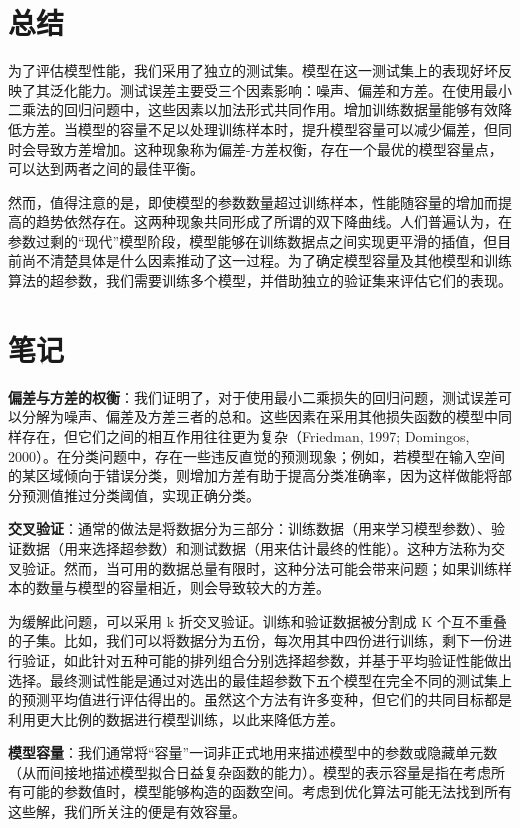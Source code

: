 \section{总结}

为了评估模型性能，我们采用了独立的测试集。模型在这一测试集上的表现好坏反映了其泛化能力。测试误差主要受三个因素影响：噪声、偏差和方差。在使用最小二乘法的回归问题中，这些因素以加法形式共同作用。增加训练数据量能够有效降低方差。当模型的容量不足以处理训练样本时，提升模型容量可以减少偏差，但同时会导致方差增加。这种现象称为偏差-方差权衡，存在一个最优的模型容量点，可以达到两者之间的最佳平衡。

然而，值得注意的是，即使模型的参数数量超过训练样本，性能随容量的增加而提高的趋势依然存在。这两种现象共同形成了所谓的双下降曲线。人们普遍认为，在参数过剩的“现代”模型阶段，模型能够在训练数据点之间实现更平滑的插值，但目前尚不清楚具体是什么因素推动了这一过程。为了确定模型容量及其他模型和训练算法的超参数，我们需要训练多个模型，并借助独立的验证集来评估它们的表现。
\section{笔记}
\textbf{偏差与方差的权衡}：我们证明了，对于使用最小二乘损失的回归问题，测试误差可以分解为噪声、偏差及方差三者的总和。这些因素在采用其他损失函数的模型中同样存在，但它们之间的相互作用往往更为复杂（Friedman, 1997; Domingos, 2000）。在分类问题中，存在一些违反直觉的预测现象；例如，若模型在输入空间的某区域倾向于错误分类，则增加方差有助于提高分类准确率，因为这样做能将部分预测值推过分类阈值，实现正确分类。

\textbf{交叉验证}：通常的做法是将数据分为三部分：训练数据（用来学习模型参数）、验证数据（用来选择超参数）和测试数据（用来估计最终的性能）。这种方法称为交叉验证。然而，当可用的数据总量有限时，这种分法可能会带来问题；如果训练样本的数量与模型的容量相近，则会导致较大的方差。

为缓解此问题，可以采用 k 折交叉验证。训练和验证数据被分割成 K 个互不重叠的子集。比如，我们可以将数据分为五份，每次用其中四份进行训练，剩下一份进行验证，如此针对五种可能的排列组合分别选择超参数，并基于平均验证性能做出选择。最终测试性能是通过对选出的最佳超参数下五个模型在完全不同的测试集上的预测平均值进行评估得出的。虽然这个方法有许多变种，但它们的共同目标都是利用更大比例的数据进行模型训练，以此来降低方差。

\textbf{模型容量}：我们通常将“容量”一词非正式地用来描述模型中的参数或隐藏单元数（从而间接地描述模型拟合日益复杂函数的能力）。模型的表示容量是指在考虑所有可能的参数值时，模型能够构造的函数空间。考虑到优化算法可能无法找到所有这些解，我们所关注的便是有效容量。

